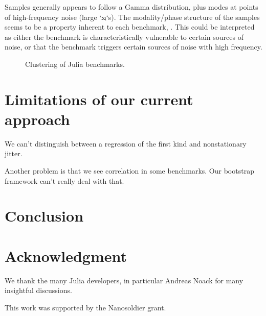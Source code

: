 \documentclass[conference]{IEEEtran}
\begin{document}
Samples generally appears to follow a Gamma distribution, plus modes at points of high-frequency noise (large `xᵢ`s). The modality/phase structure of the samples seems to be a property inherent to each benchmark, . This could be interpreted as either the benchmark is characteristically vulnerable to certain sources of noise, or that the benchmark triggers certain sources of noise with high frequency.


\begin{figure}[!t]
\centering
{}
\caption{Clustering of Julia benchmarks.}
\label{fig:benchclusters}
\end{figure}


\section{Limitations of our current approach}

We can't distinguish between a regression of the first kind and nonstationary jitter.

Another problem is that we see correlation in some benchmarks. Our bootstrap framework can't really deal with that.


\section{Conclusion}




\section*{Acknowledgment}

We thank the many Julia developers, in particular Andreas Noack for many insightful discussions.

This work was supported by the Nanosoldier grant.




\end{document}
